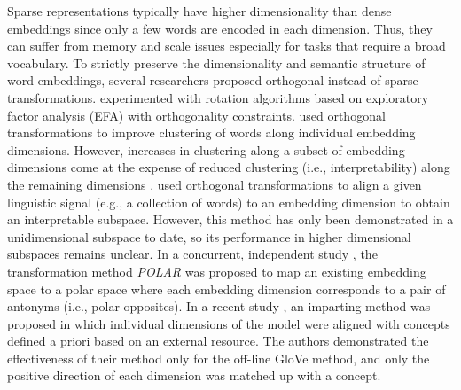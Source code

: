 \documentclass[11pt,a4paper]{article}
\begin{document}
Sparse representations typically have higher dimensionality
than dense embeddings since only a few words are encoded in each dimension. Thus, they can suffer from memory and scale issues especially for tasks that require a broad vocabulary. 
To strictly preserve the dimensionality and semantic
structure of word embeddings, several researchers proposed
orthogonal instead of sparse transformations.
\citet{park17rotated} experimented with rotation algorithms
based on exploratory factor analysis (EFA) with
orthogonality constraints. \citet{zobnin17rotations} used
orthogonal transformations  to improve clustering of words
along individual embedding dimensions. However, increases in
clustering along a subset of embedding dimensions come at
the expense of reduced clustering (i.e., interpretability)
along the remaining dimensions
\citep{zobnin17rotations}. \citet{dufter19ultraDense} used
orthogonal transformations to align a given linguistic
signal (e.g., a collection of words) to an embedding dimension  to obtain an interpretable subspace. However, this method has only been demonstrated in a unidimensional subspace to date, so its performance in higher dimensional subspaces remains unclear. In a concurrent, independent study \citep{mathew20polar}, the transformation method \textit{POLAR} was proposed to map an existing embedding space to a polar space where each embedding dimension corresponds to a pair of antonyms (i.e., polar opposites).
In a recent study \citep{senel20impart}, an imparting method
was proposed in which individual dimensions of the model
were aligned with concepts defined a priori based on an
external resource.
The authors demonstrated the effectiveness of their method only for the off-line GloVe method, and only the positive direction of each dimension was matched up with a concept. 
\end{document}
